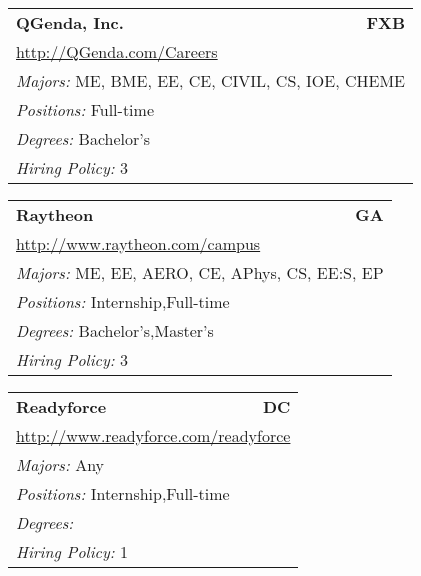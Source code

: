 \documentclass[twoside]{article}
\begin{document}
\begin{center}
\begin{multicols}{3}
\begin{FlushLeft}
\begin{minipage}{\columnwidth}
\end{minipage}
 
\begin{minipage}{\columnwidth}\begin{tabularx}{.95\columnwidth}{Xr}
                 {\Large\bf QGenda, Inc.} & {\Large\bf FXB}\\
    \multicolumn{2}{p{.95\columnwidth}}{\url{http://QGenda.com/Careers}}\\
    \multicolumn{2}{p{.95\columnwidth}}{\emph{Majors:} ME, BME, EE, CE, CIVIL, CS, IOE, CHEME}\\
    \multicolumn{2}{p{.95\columnwidth}}{\emph{Positions:} Full-time}\\
    \multicolumn{2}{p{.95\columnwidth}}{\emph{Degrees:} Bachelor's}\\
    \multicolumn{2}{p{.95\columnwidth}}{\emph{Hiring Policy:} 3}\\
    \end{tabularx}
    
\end{minipage}
 
\begin{minipage}{\columnwidth}\begin{tabularx}{.95\columnwidth}{Xr}
                 {\Large\bf Raytheon} & {\Large\bf GA}\\
    \multicolumn{2}{p{.95\columnwidth}}{\url{http://www.raytheon.com/campus}}\\
    \multicolumn{2}{p{.95\columnwidth}}{\emph{Majors:} ME, EE, AERO, CE, APhys, CS, EE:S, EP}\\
    \multicolumn{2}{p{.95\columnwidth}}{\emph{Positions:} Internship,Full-time}\\
    \multicolumn{2}{p{.95\columnwidth}}{\emph{Degrees:} Bachelor's,Master's}\\
    \multicolumn{2}{p{.95\columnwidth}}{\emph{Hiring Policy:} 3}\\
    \end{tabularx}
    
\end{minipage}
 
\begin{minipage}{\columnwidth}\begin{tabularx}{.95\columnwidth}{Xr}
                 {\Large\bf Readyforce} & {\Large\bf DC}\\
    \multicolumn{2}{p{.95\columnwidth}}{\url{http://www.readyforce.com/readyforce}}\\
    \multicolumn{2}{p{.95\columnwidth}}{\emph{Majors:} Any}\\
    \multicolumn{2}{p{.95\columnwidth}}{\emph{Positions:} Internship,Full-time}\\
    \multicolumn{2}{p{.95\columnwidth}}{\emph{Degrees:} }\\
    \multicolumn{2}{p{.95\columnwidth}}{\emph{Hiring Policy:} 1}\\
    \end{tabularx}
    

\end{minipage}
\end{FlushLeft}
\end{multicols}
\end{center}
\end{document}

